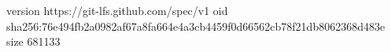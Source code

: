 version https://git-lfs.github.com/spec/v1
oid sha256:76e494fb2a0982af67a8fa664e4a3cb4459f0d66562cb78f21db8062368d483e
size 681133
